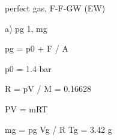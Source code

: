 perfect gas, F-F-GW (EW)

a) pg 1, mg

pg = p0 + F / A

p0 = 1.4 bar

R = pV / M = 0.16628

PV = mRT

mg = pg Vg / R Tg = 3.42 g